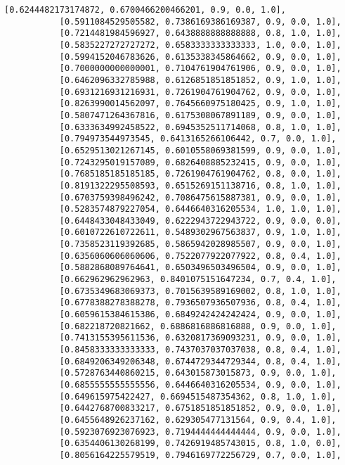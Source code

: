 \documentclass[11pt]{article}
\begin{document}
\begin{Verbatim}[commandchars=\\\{\}]
           [0.6244482173174872, 0.6700466200466201, 0.9, 0.0, 1.0],
           [0.5911084529505582, 0.7386169386169387, 0.9, 0.0, 1.0],
           [0.7214481984596927, 0.6438888888888888, 0.8, 1.0, 1.0],
           [0.5835227272727272, 0.6583333333333333, 1.0, 0.0, 1.0],
           [0.5994152046783626, 0.6135338345864662, 0.9, 0.0, 1.0],
           [0.7000000000000001, 0.7104761904761906, 0.9, 0.0, 1.0],
           [0.6462096332785988, 0.6126851851851852, 0.9, 1.0, 1.0],
           [0.6931216931216931, 0.7261904761904762, 0.9, 0.0, 1.0],
           [0.8263990014562097, 0.7645660975180425, 0.9, 1.0, 1.0],
           [0.5807471264367816, 0.6175308067891189, 0.9, 0.0, 1.0],
           [0.6333634992458522, 0.6945352511714068, 0.8, 1.0, 1.0],
           [0.794973544973545, 0.6413165266106442, 0.7, 0.0, 1.0],
           [0.6529513021267145, 0.6010558069381599, 0.9, 0.0, 1.0],
           [0.7243295019157089, 0.6826408885232415, 0.9, 0.0, 1.0],
           [0.7685185185185185, 0.7261904761904762, 0.8, 0.0, 1.0],
           [0.8191322295508593, 0.6515269151138716, 0.8, 1.0, 1.0],
           [0.6703759398496242, 0.7086475615887381, 0.9, 0.0, 1.0],
           [0.5283574879227054, 0.6446640316205534, 1.0, 1.0, 1.0],
           [0.6448433048433049, 0.6222943722943722, 0.9, 0.0, 0.0],
           [0.6010722610722611, 0.5489302967563837, 0.9, 1.0, 1.0],
           [0.7358523119392685, 0.5865942028985507, 0.9, 0.0, 1.0],
           [0.6356060606060606, 0.7522077922077922, 0.8, 0.4, 1.0],
           [0.5882868089764641, 0.6503496503496504, 0.9, 0.0, 1.0],
           [0.662962962962963, 0.8401075151647234, 0.7, 0.4, 1.0],
           [0.6735349683069373, 0.7015639589169002, 0.8, 1.0, 1.0],
           [0.6778388278388278, 0.7936507936507936, 0.8, 0.4, 1.0],
           [0.6059615384615386, 0.6849242424242424, 0.9, 0.0, 1.0],
           [0.682218720821662, 0.6886816886816888, 0.9, 0.0, 1.0],
           [0.7413155395611536, 0.6320817369093231, 0.9, 0.0, 1.0],
           [0.8458333333333333, 0.7437037037037038, 0.8, 0.4, 1.0],
           [0.6849206349206348, 0.6744729344729344, 0.8, 0.4, 1.0],
           [0.5728763440860215, 0.643015873015873, 0.9, 0.0, 1.0],
           [0.6855555555555556, 0.6446640316205534, 0.9, 0.0, 1.0],
           [0.649615975422427, 0.6694515487354362, 0.8, 1.0, 1.0],
           [0.6442768700833217, 0.6751851851851852, 0.9, 0.0, 1.0],
           [0.6455648926237162, 0.629305477131564, 0.9, 0.4, 1.0],
           [0.5923076923076923, 0.7194444444444444, 0.9, 0.0, 1.0],
           [0.6354406130268199, 0.7426919485743015, 0.8, 1.0, 0.0],
           [0.8056164225579519, 0.7946169772256729, 0.7, 0.0, 1.0],

\end{Verbatim}
\end{document}
